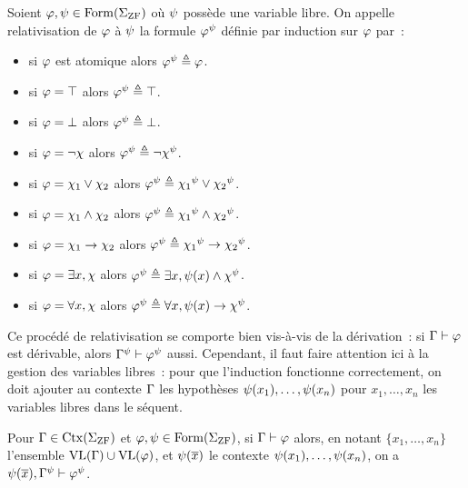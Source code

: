 \begin{definition}\label{def.relativisation}
  Soient $\varphi,\psi\in\operatorname{Form}(\Sigma_{\operatorname{ZF}})$ où $\psi$ possède une
  variable libre. On appelle relativisation de $\varphi$ à $\psi$ la formule
  $\varphi^\psi$ définie par induction sur $\varphi$ par~:
  \begin{itemize}
  \item si $\varphi$ est atomique alors $\varphi^\psi \triangleq \varphi$.
  \item si $\varphi = \top$ alors $\varphi^\psi \triangleq \top$.
  \item si $\varphi = \bot$ alors $\varphi^\psi \triangleq \bot$.
  \item si $\varphi = \lnot \chi$ alors
    $\varphi^\psi \triangleq \lnot \chi^\psi$.
  \item si $\varphi = \chi_1 \lor \chi_2$ alors
    $\varphi^\psi \triangleq {\chi_1}^\psi \lor {\chi_2}^\psi$.
  \item si $\varphi = \chi_1 \land \chi_2$ alors
    $\varphi^\psi \triangleq {\chi_1}^\psi \land {\chi_2}^\psi$.
  \item si $\varphi = \chi_1 \to \chi_2$ alors
    $\varphi^\psi \triangleq {\chi_1}^\psi \to {\chi_2}^\psi$.
  \item si $\varphi = \exists x, \chi$ alors
    $\varphi^\psi \triangleq \exists x, \psi(x) \land \chi^\psi$.
  \item si $\varphi = \forall x, \chi$ alors
    $\varphi^\psi \triangleq \forall x, \psi(x) \to \chi^\psi$.
  \end{itemize}
\end{definition}

Ce procédé de relativisation se comporte bien vis-à-vis de la dérivation~: si
$\Gamma\vdash\varphi$ est dérivable, alors $\Gamma^\psi\vdash\varphi^\psi$ aussi.
Cependant, il faut faire attention ici à la gestion des variables libres~:
pour que l'induction fonctionne correctement, on doit ajouter au contexte
$\Gamma$ les hypothèses $\psi(x_1),\ldots,\psi(x_n)$ pour $x_1,\ldots,x_n$
les variables libres dans le séquent.

\begin{lemma}\label{lem.relat.deduc}
  Pour $\Gamma\in\operatorname{Ctx}(\Sigma_{\operatorname{ZF}})$ et
  $\varphi,\psi\in\operatorname{Form}(\Sigma_{\operatorname{ZF}})$, si $\Gamma\vdash \varphi$ alors, en
  notant $\{x_1,\ldots,x_n\}$ l'ensemble $\operatorname{VL}(\Gamma)\cup\operatorname{VL}(\varphi)$, et
  $\psi(\overline{x})$ le contexte $\psi(x_1),\ldots,\psi(x_n)$, on a
  $\psi(\overline{x}),\Gamma^\psi\vdash\varphi^\psi$.
\end{lemma}

